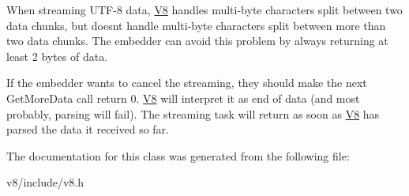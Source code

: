 When streaming U\+T\+F-\/8 data, \hyperlink{classv8_1_1V8}{V8} handles multi-\/byte characters split between two data chunks, but doesn\textquotesingle{}t handle multi-\/byte characters split between more than two data chunks. The embedder can avoid this problem by always returning at least 2 bytes of data.

If the embedder wants to cancel the streaming, they should make the next Get\+More\+Data call return 0. \hyperlink{classv8_1_1V8}{V8} will interpret it as end of data (and most probably, parsing will fail). The streaming task will return as soon as \hyperlink{classv8_1_1V8}{V8} has parsed the data it received so far. 

The documentation for this class was generated from the following file\+:\begin{DoxyCompactItemize}
\item 
v8/include/v8.\+h\end{DoxyCompactItemize}
